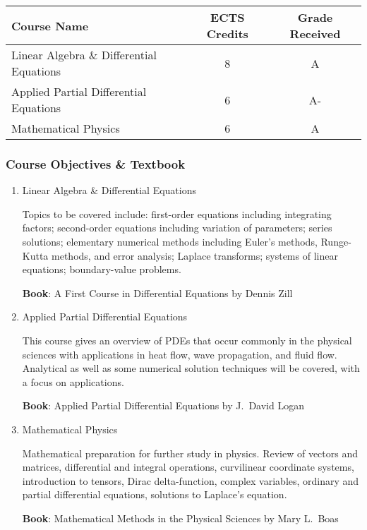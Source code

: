 \documentclass[11pt]{article}
\begin{document}
\begin{center}
\begin{tabular}{lcc}
Course Name & ECTS Credits & Grade Received \\ \toprule
Linear Algebra \& Differential Equations & 8 & A \\
Applied Partial Differential Equations & 6 & A- \\
Mathematical Physics & 6 & A
\end{tabular}
\end{center}
\subsubsection*{Course Objectives \& Textbook}
\begin{enumerate}
    \item Linear Algebra \& Differential Equations
    
    Topics to be covered include: first-order equations including integrating factors; second-order equations including variation of parameters; series solutions; elementary numerical methods including Euler’s methods, Runge-Kutta methods, and error analysis; Laplace transforms; systems of linear equations; boundary-value problems.
    
    \textbf{Book}: A First Course in Differential Equations by Dennis Zill

    \item Applied Partial Differential Equations
    
    This course gives an overview of PDEs that occur commonly in the physical sciences with applications in heat flow, wave propagation, and fluid flow. Analytical as well as some numerical solution techniques will be covered, with a focus on applications.
    
    \textbf{Book}: Applied Partial Differential Equations by J.\ David Logan

    \item Mathematical Physics
    
    Mathematical preparation for further study in physics. Review of vectors and matrices, differential and integral operations, curvilinear coordinate systems, introduction to tensors, Dirac delta-function, complex variables, ordinary and partial differential equations, solutions to Laplace's equation.
    
    \textbf{Book}: Mathematical Methods in the Physical Sciences by Mary L.\ Boas
\end{enumerate}
\end{document}
